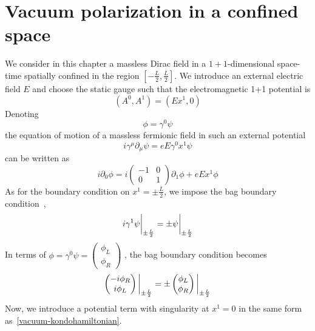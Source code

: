 \section{Vacuum polarization in a confined space}\label{sect-nef}
We consider in this chapter a massless Dirac field in a $1+1$-dimensional space-time spatially confined in the region $[-\frac L 2 , \frac L 2 ]$.
We introduce an external electric field $E$ and choose the static gauge such that the electromagnetic 1+1 potential is
\begin{equation*}
(A^0, A^1) = (E x^1, 0)
\end{equation*}
Denoting 
\begin{equation*}
\phi = \gamma^0\psi
\end{equation*} 
the equation of motion of a massless fermionic field in such an external potential 
\begin{equation*}
i\gamma^\mu\partial_\mu \psi = eE\gamma^0 x^1 \psi
\end{equation*}
can be written as
\begin{equation*}
i\partial_0\phi = i \begin{pmatrix} -1 & 0 \\ 0 & 1 \end{pmatrix}\partial_1\phi
+ eEx^1\phi
\end{equation*}
%
As for the boundary condition on $x^1 = \pm \frac L 2$, we impose the bag boundary condition~\cite{Chodos1974}, \ie 
\begin{equation*}
i\gamma^1 \psi \bigg\rvert_{\pm \frac{L}{2}} = \pm \psi \bigg\rvert_{\pm \frac{L}{2}}
\end{equation*}
In terms of $\phi = \gamma^0\psi = \begin{pmatrix} \phi_L \\ \phi_R \end{pmatrix}$
, the bag boundary condition becomes
\begin{equation}\label{vacuum-bagboundcond}
\begin{pmatrix}
-i \phi_R \\
i \phi_L
\end{pmatrix} \bigg\rvert_{\pm \frac{L}{2}} = \pm \begin{pmatrix}
\phi_L \\
\phi_R
\end{pmatrix} \bigg\rvert_{\pm \frac{L}{2}}
\end{equation}
%
Now, we introduce a potential term with singularity at $x^1 = 0$ in the same form as~\cref{vacuum-kondohamiltonian}.
